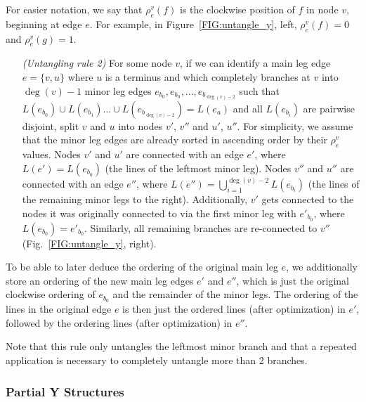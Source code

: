 \documentclass[sigconf]{acmart}
\begin{document}
For easier notation, we say that $\rho^v_e(f)$ is the clockwise position of $f$ in node $v$, beginning at edge $e$. For example, in Figure~\ref{FIG:untangle_y}, left, $\rho^v_e(f) = 0$ and $\rho^v_e(g) = 1$.
\begin{enumerate}[parsep=0.5mm, wide, labelwidth=0mm, itemindent=2.3mm]
  \setlength\itemsep{1pt}
  \item[\emph{(Untangling rule 2)}] For some node $v$, if we can identify a main leg edge $e = \{v, u\}$ where $u$ is a terminus and which completely branches at $v$ into $\deg(v) - 1$ minor leg edges $e_{b_0}, e_{b_0}, ..., e_{b_{\deg(v) - 2}}$ such that $L(e_{b_0}) \cup L(e_{b_1}) ... \cup L(e_{b_{\deg(v) - 2}}) = L(e_a)$ and all $L(e_{b_i})$ are pairwise disjoint, split $v$ and $u$ into nodes $v'$, $v''$ and $u'$, $u''$. For simplicity, we assume that the minor leg edges are already sorted in ascending order by their $\rho^v_{e}$ values. Nodes $v'$ and $u'$ are connected with an edge $e'$, where $L(e') = L(e_{b_0})$ (the lines of the leftmost minor leg). Nodes $v''$ and $u''$ are connected with an edge $e''$, where $L(e'') = \bigcup^{\deg(v) - 2}_{i = 1} L(e_{b_i})$ (the lines of the remaining minor legs to the right). Additionally, $v'$ gets connected to the nodes it was originally connected to via the first minor leg with $e'_{b_0}$, where $L(e_{b_0}) = e'_{b_0}$. Similarly, all remaining branches are re-connected to $v''$ (Fig.~\ref{FIG:untangle_y}, right).
\end{enumerate}

To be able to later deduce the ordering of the original main leg $e$, we additionally store an ordering of the new main leg edges $e'$ and $e''$, which is just the original clockwise ordering of $e_{b_0}$ and the remainder of the minor legs. The ordering of the lines in the original edge $e$ is then just the ordered lines (after optimization) in $e'$, followed by the ordering lines (after optimization) in $e''$.

Note that this rule only untangles the leftmost minor branch and that a repeated application is necessary to completely untangle more than 2 branches.

\subsubsection{Partial Y Structures}
\end{document}
